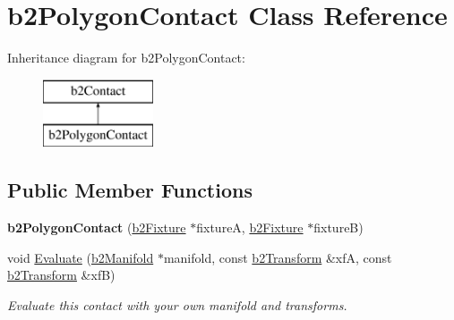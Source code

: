 \hypertarget{classb2_polygon_contact}{}\section{b2\+Polygon\+Contact Class Reference}
\label{classb2_polygon_contact}
Inheritance diagram for b2\+Polygon\+Contact\+:\begin{figure}[H]
\begin{center}
\leavevmode
\includegraphics[height=2.000000cm]{classb2_polygon_contact}
\end{center}
\end{figure}
\subsection*{Public Member Functions}
\begin{DoxyCompactItemize}
\item 
{\bfseries b2\+Polygon\+Contact} (\hyperlink{classb2_fixture}{b2\+Fixture} $\ast$fixtureA, \hyperlink{classb2_fixture}{b2\+Fixture} $\ast$fixtureB)\hypertarget{classb2_polygon_contact_a93cabf086e75ae40dcd1881760c71c63}{}\label{classb2_polygon_contact_a93cabf086e75ae40dcd1881760c71c63}

\item 
void \hyperlink{classb2_polygon_contact_ae75f78bb52c76fc4fffda4d91e62d354}{Evaluate} (\hyperlink{structb2_manifold}{b2\+Manifold} $\ast$manifold, const \hyperlink{structb2_transform}{b2\+Transform} \&xfA, const \hyperlink{structb2_transform}{b2\+Transform} \&xfB)\hypertarget{classb2_polygon_contact_ae75f78bb52c76fc4fffda4d91e62d354}{}\label{classb2_polygon_contact_ae75f78bb52c76fc4fffda4d91e62d354}

\begin{DoxyCompactList}\small\item\em Evaluate this contact with your own manifold and transforms. \end{DoxyCompactList}\end{DoxyCompactItemize}
